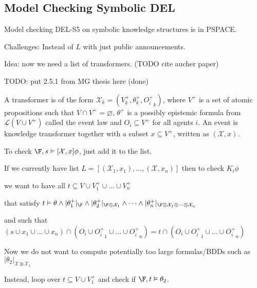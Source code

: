
\subsection{Model Checking Symbolic DEL}


\begin{theorem}\label{thm:SymDEL}
Model checking DEL-S5 on symbolic knowledge structures is in PSPACE.
\end{theorem}

Challenges: Instead of $L$ with just public announcements.

Idea: now we need a list of transformers. (TODO cite aucher paper)

\begin{defi} TODO: put 2.5.1 from MG thesis here (done)

A transformer is of the form $\mathcal{X}_k = (V^+_k, \theta^+_k, {O_i^+}_k)$, where $V^+$ is a set of atomic propositions such that $V \cap V^+ = \varnothing$, $\theta^+$ is a possibly epistemic formula from $\mathcal{L}(V \cup V^+)$ called the event law and $O_i \subseteq V^+$ for all agents $i$. An event is knowledge transformer together with a subset $x \subseteq V^+$, written as $(\mathcal{X}, x)$. 
\end{defi}


To check $\F,s \vDash [\mathcal{X},x]\phi$, just add it to the list.

If we currently have list $L = [ (\mathcal{X}_1, x_1), \dots, (\mathcal{X},x_n) ]$
then to check $K_i \phi$ 

we want to have all $t \subseteq V \cup V^+_1 \cup \dots \cup V^+_n$

that satisfy $t \vDash \theta
\land |\theta_1^+|_\F
\land |\theta_2^+|_{\F \otimes \mathcal{X}_1}
\land \dots
\land |\theta_n^+|_{\F \otimes \mathcal{X}_1 \otimes \dots \otimes \mathcal{X}_n} $

and such that $(s \cup x_1 \cup \dots \cup x_n) \cap (O_i \cup {O_i^+}_1 \cup \dots \cup {O_i^+}_n) = t \cap (O_i \cup {O_i^+}_1 \cup \dots \cup {O_i^+}_n)$

Now we do not want to compute potentially too large formulas/BDDs such as $|\theta_2|_{\mathcal{X} \otimes \mathcal{X}_1}$

Instead, loop over $t \subseteq V \cup V^+_1$ and check if 
$\F, t \vDash \theta_2$. 

